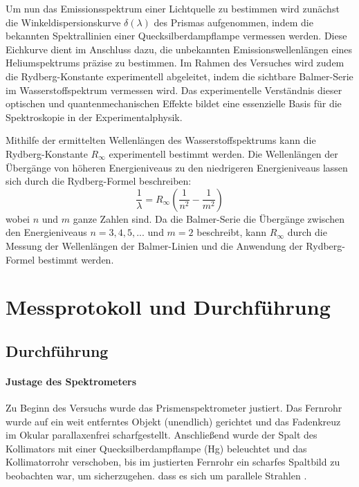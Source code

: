 \documentclass[12pt,a4paper,titlepage]{scrartcl}
\numberwithin{equation}{section}
\numberwithin{table}{section}
\numberwithin{figure}{section}
\begin{document}
Um nun das Emissionsspektrum einer Lichtquelle zu bestimmen wird zunächst die Winkeldispersionskurve $\delta(\lambda)$ des Prismas aufgenommen, indem die bekannten Spektrallinien einer Quecksilberdampflampe vermessen werden. Diese Eichkurve dient im Anschluss dazu, die unbekannten Emissionswellenlängen eines Heliumspektrums präzise zu bestimmen. Im Rahmen des Versuches wird zudem die Rydberg-Konstante experimentell abgeleitet, indem die sichtbare Balmer-Serie im Wasserstoffspektrum vermessen wird. Das experimentelle Verständnis dieser optischen und quantenmechanischen Effekte bildet eine essenzielle Basis für die Spektroskopie in der Experimentalphysik.

Mithilfe der ermittelten Wellenlängen des Wasserstoffspektrums kann die Rydberg-Konstante $R_\infty$ experimentell bestimmt werden. Die Wellenlängen der Übergänge von höheren Energieniveaus zu den niedrigeren Energieniveaus lassen sich durch die Rydberg-Formel beschreiben:
\begin{equation}
    \frac{1}{\lambda} = R_\infty \left( \frac{1}{n^2} - \frac{1}{m^2} \right)\label{eq:Rydberg}
\end{equation}
wobei $n$ und $m$ ganze Zahlen sind. Da die Balmer-Serie die Übergänge zwischen den Energieniveaus $n=3, 4, 5, ...$ und $m=2$ beschreibt, kann $R_\infty$ durch die Messung der Wellenlängen der Balmer-Linien und die Anwendung der Rydberg-Formel bestimmt werden.

\section{Messprotokoll und Durchführung}

\subsection{Durchführung}

\paragraph{Justage des Spektrometers}
Zu Beginn des Versuchs wurde das Prismenspektrometer justiert. Das Fernrohr wurde auf ein weit entferntes Objekt (unendlich) gerichtet und das Fadenkreuz im Okular parallaxenfrei scharfgestellt. Anschließend wurde der Spalt des Kollimators mit einer Quecksilberdampflampe (Hg) beleuchtet und das Kollimatorrohr verschoben, bis im justierten Fernrohr ein scharfes Spaltbild zu beobachten war, um sicherzugehen. dass es sich um parallele Strahlen .
\end{document}
